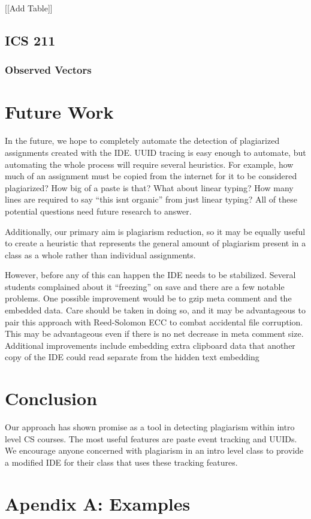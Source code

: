 \documentclass[conference]{IEEEtran}
\newcommand{\n}{\hfill\break}
\begin{document}
[[Add Table]]
\subsection*{\textbf{ICS 211}}

\n\subsubsection*{\textbf{Observed Vectors}}\hfill\break\indent

\n\section{\textbf{Future Work}}
In the future, we hope to completely automate the detection of plagiarized assignments created with the IDE.  UUID tracing is easy enough to automate, but automating the whole process will require several heuristics.  For example, how much of an assignment must be copied from the internet for it to be considered plagiarized?  How big of a paste is that?  What about linear typing?  How many lines are required to say ``this isnt organic'' from just linear typing?  All of these potential questions need future research to answer.  

Additionally, our primary aim is plagiarism reduction, so it may be equally useful to create a heuristic that represents the general amount of plagiarism present in a class as a whole rather than individual assignments. 

However, before any of this can happen the IDE needs to be stabilized.  Several students complained about it ``freezing'' on save and there are a few notable problems.  One possible improvement would be to gzip meta comment and the embedded data.  Care should be taken in doing so, and it may be advantageous to pair this approach with Reed-Solomon ECC to combat accidental file corruption.  This may be advantageous even if there is no net decrease in meta comment size.  Additional improvements include embedding extra clipboard data that another copy of the IDE could read separate from the hidden text embedding
\n\section{\textbf{Conclusion}}
Our approach has shown promise as a tool in detecting plagiarism within intro level CS courses.  The most useful features are paste event tracking and UUIDs.  We encourage anyone concerned with plagiarism in an intro level class to provide a modified IDE for their class that uses these tracking features.

{}
 

\section{\textbf{Apendix A: Examples}}
\end{document}
